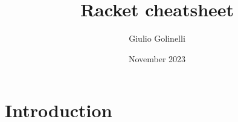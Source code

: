 \documentclass{article}
\title{Racket cheatsheet}
\author{Giulio Golinelli}
\date{November 2023}
\begin{document}
\maketitle

\section{Introduction}
\end{document}
